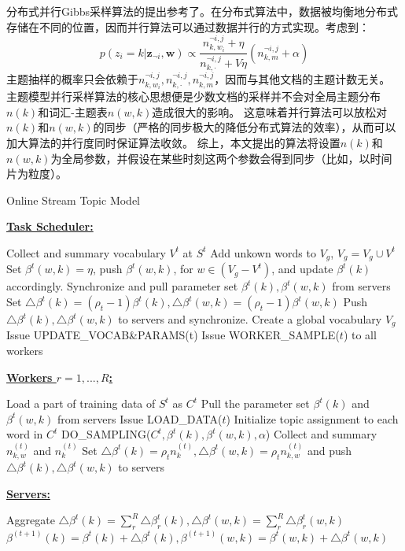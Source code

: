 分布式并行Gibbs采样算法的提出参考了\cite{smola2010an}。在分布式算法中，数据被均衡地分布式存储在不同的位置，因而并行算法可以通过数据并行的方式实现。考虑到：
\begin{equation}
p( z_i = k | \mathbf{z}_{\neg i},  \mathbf{w}) 
 \propto \dfrac{ n_{k, w_i}^{\neg i,j} + \eta }{ n_{k, \cdot}^{\neg i,j} + V\eta}
(n_{k, m}^{\neg i,j} + \alpha)
\end{equation}
主题抽样的概率只会依赖于$n_{k, w_i}^{\neg i,j}, n_{k, \cdot}^{\neg i,j}, n_{k, m}^{\neg i,j}$，因而与其他文档的主题计数无关。
主题模型并行采样算法的核心思想便是少数文档的采样并不会对全局主题分布$n(k)$和词汇-主题表$n(w, k)$造成很大的影响。
这意味着并行算法可以放松对$n(k)$和$n(w, k)$的同步（严格的同步极大的降低分布式算法的效率），从而可以加大算法的并行度同时保证算法收敛。
综上，本文提出的算法将设置$n(k)$和$n(w, k)$为全局参数，并假设在某些时刻这两个参数会得到同步（比如，以时间片为粒度）。
\begin{algorithm}[]
\caption{Online Stream Topic Model}
\label{alg:onlineStreamLDA}
\textbf{\underline{Task Scheduler:}}
\begin{algorithmic}[1]
\State Collect and summary vocabulary $V^t$ at $S^t$
\State Add unkown words to $V_g$, $V_g = V_g \cup V^t$
\State Set $\beta^t(w, k) = \eta$, push $\beta^t(w, k)$, for $w \in (V_g - V^t)$, and update $\beta^t(k)$ accordingly.
\State Synchronize and pull parameter set $\beta^t(k), \beta^t(w, k)$ from servers
\State Set $\bigtriangleup \beta^t(k) = (\rho_t - 1) \beta^t(k), \bigtriangleup \beta^t(w, k) = (\rho_t - 1) \beta^t(w, k)$
\State Push $\bigtriangleup \beta^t(k), \bigtriangleup \beta^t(w, k)$  to servers and synchronize.
\EndFunction
\State Create a global vocabulary $V_g$
\State Issue UPDATE\_VOCAB\&PARAMS(t)
\State Issue WORKER\_SAMPLE($t$) to all workers
\EndFor
\end{algorithmic}
\textbf{\underline{Workers $r = 1, ..., R$:}}
\begin{algorithmic}[1]
\State Load a part of training data of $S^t$ as $C^t$
\State Pull the parameter set $\beta^t(k)$ and $\beta^t(w, k)$ from servers
\EndFunction
{}
\State Issue LOAD\_DATA($t$)
\State Initialize topic assignment to each word in $C^t$ 
\State DO\_SAMPLING($C^t, \beta^t(k), \beta^t(w, k), \alpha$)
\EndFor
\State Collect and summary $n_{k,w}^{(t)}$ and $n_{k}^{(t)}$
\State Set $\bigtriangleup \beta^t(k) = \rho_t n_{k}^{(t)}, \bigtriangleup \beta^t(w, k) = \rho_t n_{k,w}^{(t)}$ and push $\bigtriangleup \beta^t(k), \bigtriangleup \beta^t(w, k)$ to servers
\EndFunction
\end{algorithmic}  
\textbf{\underline{Servers:}}
\begin{algorithmic}[1]
\State Aggregate $\bigtriangleup \beta^t(k) = \sum_r^R{\bigtriangleup \beta^t_r(k)}, \bigtriangleup \beta^t(w, k) = \sum_r^R{\bigtriangleup \beta^t_r(w, k)}$
\State $\beta^{(t+1)}(k) =\beta^t(k) +  \bigtriangleup \beta^t(k), \beta^{(t+1)}(w, k) = \beta^t(w, k) + \bigtriangleup \beta^t(w, k)$
\EndFunction
\end{algorithmic}
\end{algorithm}  


